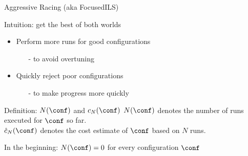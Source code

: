 \begin{frame}[c,fragile]{Aggressive Racing (aka FocusedILS)}

Intuition: get the best of both worlds
\begin{itemize}
\item Perform more runs for good configurations
\begin{itemize}
\item[-] to avoid overtuning
\end{itemize}
\item Quickly reject poor configurations
\begin{itemize}
\item[-] to make progress more quickly
\end{itemize}
\end{itemize}

\pause
\medskip

\begin{block}{Definition: $N(\conf)$ and $c_N(\conf)$}
\alert{$N(\conf)$} denotes the number of runs executed for $\conf$ so far.\\
\alert{$\hat{c}_N(\conf)$} denotes the cost estimate of $\conf$ based on $N$ runs.
\end{block}

\pause
In the beginning: $N(\conf)=0$ for every configuration $\conf$

\end{frame}




